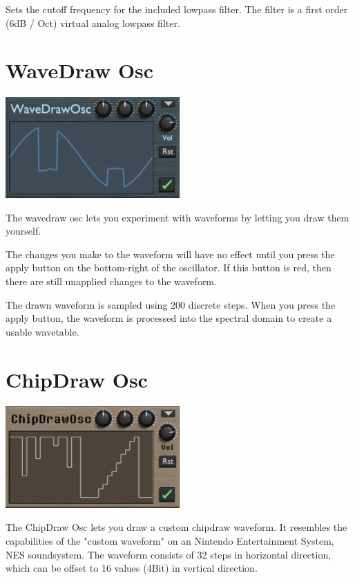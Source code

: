 {Sets the cutoff frequency for the included lowpass filter. The filter is a first order (6dB / Oct) virtual analog lowpass filter.}

\section{WaveDraw Osc}
\label{wavedraw}
\begin{center}
    \includegraphics[width=0.5\textwidth]{graphics/wavedraw_osc.png}
\end{center}
The wavedraw osc lets you experiment with waveforms by letting you draw them yourself.

\begin{tcolorbox}[colback=yellow!10!white,
        colframe=white!20!black,
        center,
        valign=top,
        halign=left,
        center title,
        width=\textwidth]

    The changes you make to the waveform will have no effect until you press the apply button on the bottom-right of the oscillator. If this button is red, then there are still unapplied changes to the waveform.
\end{tcolorbox}

The drawn waveform is sampled using 200 discrete steps. When you press the apply button, the waveform is processed into the spectral domain to create a usable wavetable.

\section{ChipDraw Osc}
\label{chipdraw}
\begin{center}
    \includegraphics[width=0.5\textwidth]{graphics/chipdraw_osc.png}
\end{center}
The ChipDraw Osc lets you draw a custom chipdraw waveform. It resembles the capabilities of the "custom waveform" on an Nintendo Entertainment System, NES soundsystem. The waveform consists of 32 steps in horizontal direction, which can be offset to 16 values (4Bit) in vertical direction.

